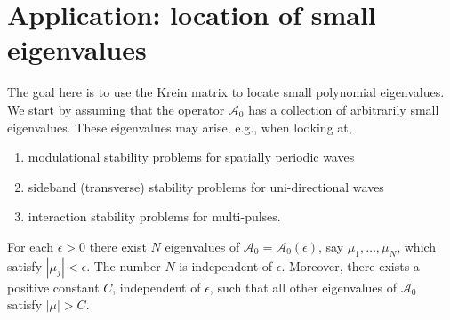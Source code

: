 \documentclass[review,onefignum,onetabnum]{siamart171218}
\newcommand{\rmi}{\mathrm{i}}
\newcommand{\calA}{\mathcal{A}}
\begin{document}

\section{Application: location of small eigenvalues}\label{s:5}

The goal here is to use the Krein matrix to locate small polynomial eigenvalues.
We start by assuming that the operator $\calA_0$ has a collection of arbitrarily small eigenvalues. These eigenvalues may arise, e.g., when looking at,
\begin{enumerate}
  \item modulational stability problems for spatially periodic waves
  \item sideband (transverse) stability problems for uni-directional waves
  \item interaction stability problems for multi-pulses.
\end{enumerate}

\begin{assumption}\label{ass:smalleval}
For each $\epsilon>0$ there exist $N$ eigenvalues of $\calA_0=\calA_0(\epsilon)$, say $\mu_1,\dots,\mu_N$, which satisfy $|\mu_j|<\epsilon$. The number $N$ is independent of $\epsilon$. Moreover, there exists a positive constant $C$, independent of $\epsilon$, such that all other eigenvalues of $\calA_0$ satisfy $|\mu|>C$.
\end{assumption}
\end{document}
